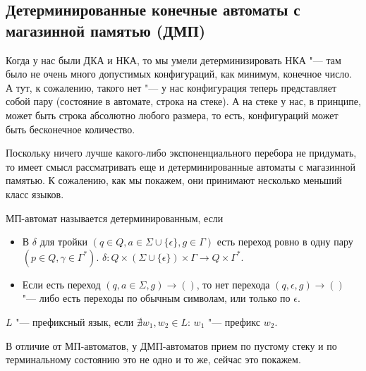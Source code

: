 \subsection{Детерминированные конечные автоматы с магазинной памятью (ДМП)}
Когда у нас были ДКА и НКА, то мы умели детерминизировать НКА "--- там было не очень много допустимых конфигураций, как минимум, конечное число.
А тут, к сожалению, такого нет "--- у нас конфигурация теперь представляет собой пару (состояние в автомате, строка на стеке). 
А на стеке у нас, в принципе, может быть строка абсолютно любого размера, то есть, конфигураций может быть бесконечное количество.

Поскольку ничего лучше какого-либо экспоненциального перебора не придумать, то имеет смысл рассматривать еще и детерминированные автоматы с магазинной памятью.
К сожалению, как мы покажем, они принимают несколько меньший класс языков.

\begin{Def}
МП-автомат называется детерминированным, если 
\begin{itemize}
    \item
        В $\delta$ для тройки $(q \in Q, a \in \Sigma \cup \{\epsilon\}, g \in \Gamma)$ есть переход ровно в одну пару $(p \in Q, \gamma \in \Gamma^*)$.
        $\delta\colon Q \times (\Sigma \cup \{\epsilon\}) \times \Gamma \to Q \times \Gamma^*$.
    \item
        Если есть переход $(q, a \in \Sigma, g) \to ()$, то нет перехода $(q, \epsilon, g) \to ()$ "--- либо есть переходы по обычным символам, или только по $\epsilon$.
\end{itemize}
\end{Def}

\begin{Def}
    $L$ "--- префиксный язык, если $\nexists w_1, w_2 \in L$: $w_1$ "--- префикс $w_2$.
\end{Def}

В отличие от МП-автоматов, у ДМП-автоматов прием по пустому стеку и по терминальному состоянию это не одно и то же, сейчас это покажем.

